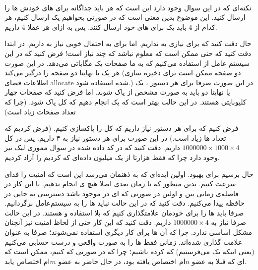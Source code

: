 \\\noindent
نکته‌ای که در این سوال وجود دارد این است که هر
باید جداگانه برای
های
خودش
ها
را ارسال کنید. این موضوع بدین معنی است که در صورتی بخواهیم یک
ارسال کنیم،‌ هر کدام از 4
باید یک
برای
های خود ارسال کنند.
پس به ازای هر
عملا
4
داریم.

حال دقت کنید که برای
نیازی به
نداریم. اما برای
به احتمال خوبی نیاز به
داریم. در ابتدا دقت کنید که حتی ممکن است که معلوم نباشد که چند
نیاز است! فرض کنید که در این سیستم عامل از
استفاده می‌کنیم که به ما صفحات یک مگاباتی می‌دهد. در این صورت هر
یک یا نهایتا دو صفحه را درگیر می‌کند (دو صفحه ممکن است برای ذخیره سازی اطلاعات فضای allocate شده استفاده شود.)
در این صورت صرفا برای هر دستور
،
یک یا نهایتا دو
باید به صورت مشخص از
پاک شوند.
اما فرض کنید که صفحات چهار کلیوبایتی هستند. در این حالت بهتر است که یک
انجام دهیم که کل
پاک شود. (چرا که تعداد صفحات زیاد است)

فرض کنیم که برای هر دستور
نیاز داریم که کل
را پاکسازی کنیم. (فرض کردیم که تعداد ها زیاد است.)
در این صورت برای هر دستور
نیاز به ۴
داریم. پس در کل
$1000000 \times 1000 \times 4$
داریم. دقت کنید که در کد داده شده در سوال مموری لیک نیز وجود دارد چرا که فقط هزارتا
از یک میلیون داده‌ای که
کردیم را آزاد کردیم.

حال برسیم برای بهبود. اولین ایده‌ای که به ذهنمان می‌رسد این است که امنیت را فدای سرعت کنیم.
بدین منظور که تا زمان
بعدی اصلا هیچ
ی
انجام ندهیم. با این کار در فاصله‌ی زمانی بین
 و اولین 
در صورتی که
ای
در
موجود باشد دسترسی به جایی
در حافظه پیدا می‌کنیم. دقت کنید که در این حالت نباید
ها
را به سیستم‌عامل برگردانیم. صرفا باید
ها
را برای خودمان علامتگذاری کنیم که بلا استفاده و
هستند. در این حالت صرفا نیاز به
$1000000 \times 4$
داریم. دقت کنید که این کار حتی از لحاظ امنیت نیز آنچنان مشکل اساسی ندارد.
چرا که آن
ها
برای کار دیگری استفاده نمی‌شوند؛ صرفا به عنوان
علامت گذاری شده‌اند. زمانی فقط
ها
را به صورت واقعی و درست حسابی
می‌کنیم
(یعنی اینکه یک  می‌فرستیم)
که
کرده باشیم؛ چرا که در صورتی که
کنیم، ممکن است که
ای
که قبلا به عضو
$n$ام
اختصاص یافته بود، در حال حاضر به عضو
$m$ام
اختصاص یابد.


